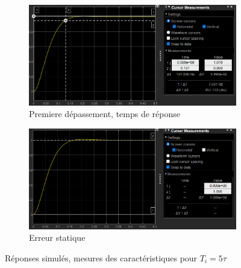 \documentclass[12pt, a4paper]{report}
\begin{document}
\begin{figure}[H]
    \begin{subfigure}[h!]{0.46\linewidth}
        \includegraphics[width=\linewidth]{sim1t5tautr5prc&1erdep.png}
        \caption{Premiere dépassement, temps de réponse}
    \end{subfigure}
    \hfill
    \begin{subfigure}[h!]{0.46\linewidth}
        \includegraphics[width=\linewidth]{sim1t5tauerrur.png}
        \caption{Erreur statique}
    \end{subfigure}
    \caption{Réponses simulés, mesures des caractéristiques pour $T_i = 5\tau$}
    \label{fig:ti5tau}
\end{figure}
\end{document}
